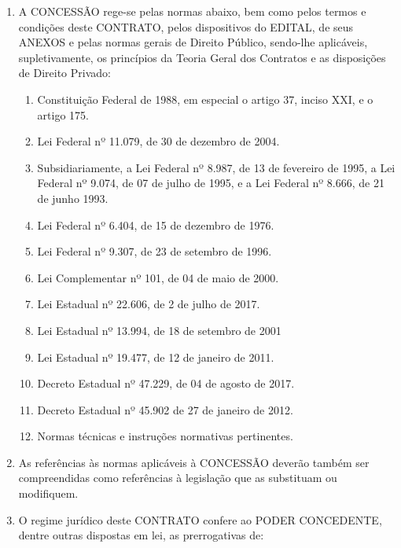 \documentclass[a4paper,11pt]{report} %
\begin{document}
\begin{enumerate}
\item \label{itm:A5JT} A CONCESSÃO rege-se pelas normas abaixo, bem como pelos termos e condições deste CONTRATO, pelos dispositivos do EDITAL, de seus ANEXOS e pelas normas gerais de Direito Público, sendo-lhe aplicáveis, supletivamente, os princípios da Teoria Geral dos Contratos e as disposições de Direito Privado:

\begin{enumerate}[label*=\arabic*.]
\item \label{itm:3CK8} Constituição Federal de 1988, em especial o artigo 37, inciso XXI, e o artigo 175.
\item \label{itm:6FZL} Lei Federal nº 11.079, de 30 de dezembro de 2004.
\item \label{itm:3QJD} Subsidiariamente, a Lei Federal nº 8.987, de 13 de fevereiro de 1995, a Lei Federal nº 9.074, de 07 de julho de 1995, e a Lei Federal nº 8.666, de 21 de junho 1993.
\item \label{itm:WHLA} Lei Federal nº 6.404, de 15 de dezembro de 1976.
\item \label{itm:628W} Lei Federal nº 9.307, de 23 de setembro de 1996.
\item \label{itm:9YPH} Lei Complementar nº 101, de 04 de maio de 2000.
\item \label{itm:6WF3} Lei Estadual nº 22.606, de 2 de julho de 2017.
\item \label{itm:EUAC} Lei Estadual nº 13.994, de 18 de setembro de 2001
\item \label{itm:NFZG} Lei Estadual nº 19.477, de 12 de janeiro de 2011.
\item \label{itm:E8WP} Decreto Estadual nº 47.229, de 04 de agosto de 2017.
\item \label{itm:ZGSQ} Decreto Estadual nº 45.902 de 27 de janeiro de 2012.
\item \label{itm:XVAC} Normas técnicas e instruções normativas pertinentes.
\end{enumerate}


\item \label{itm:DS3Z} As referências às normas aplicáveis à CONCESSÃO deverão também ser compreendidas como referências à legislação que as substituam ou modifiquem.
        	
\item \label{itm:N2VY} O regime jurídico deste CONTRATO confere ao PODER CONCEDENTE, dentre outras dispostas em lei, as prerrogativas de:


\end{enumerate}
\end{document}
